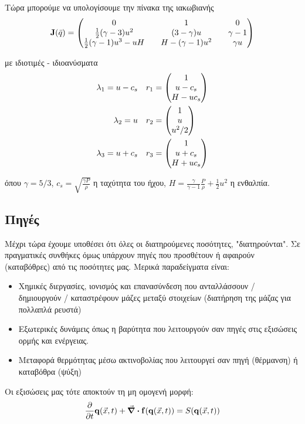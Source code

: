 Τώρα μπορούμε να υπολογίσουμε την πίνακα της ιακωβιανής
\begin{equation}
 \mathbf{J}(\bar{q}) = \mqty(0 && 1 && 0\\
	  \frac{1}{2}(\gamma-3)u^2 && (3-\gamma) u && \gamma-1 \\
	  \frac{1}{2}(\gamma-1)u^3-uH && H-(\gamma-1) u^2 && \gamma u)
\end{equation} 

με ιδιοτιμές - ιδιοανύσματα
\begin{align}
\lambda _1 = u-c_s && &r_1 =\mqty(1\\ u-c_s \\ H-uc_s) \\
\lambda _2 = u && &r_2 =\mqty(1\\ u \\ u^2/2) \\
\lambda _3 = u+c_s && &r_3 =\mqty(1\\ u+c_s \\ H+uc_s) \\
\end{align}

όπου $\gamma=5/3$, $c_s=\sqrt{\frac{\gamma P}{\rho}}$ η ταχύτητα του ήχου, $H=\frac{\gamma}{\gamma-1}\frac{P}{\rho}+\frac{1}{2}u^2$ η ενθαλπία.

\subsection{Πηγές}
Μέχρι τώρα έχουμε υποθέσει ότι όλες οι διατηρούμενες ποσότητες, "διατηρούνται". Σε πραγματικές συνθήκες όμως υπάρχουν πηγές που προσθέτουν ή αφαιρούν (καταβόθρες) από τις ποσότητες μας. Μερικά παραδείγματα είναι:
\begin{itemize}
	\item Χημικές διεργασίες, ιονισμός και επανασύνδεση που ανταλλάσσουν / δημιουργούν / καταστρέφουν μάζες μεταξύ στοιχείων (διατήρηση της μάζας για πολλαπλά ρευστά)
	\item Εξωτερικές δυνάμεις όπως η βαρύτητα που λειτουργούν σαν πηγές στις εξισώσεις ορμής και ενέργειας.
	\item Μεταφορά θερμότητας μέσω ακτινοβολίας που λειτουργεί σαν πηγή (θέρμανση) ή καταβόθρα (ψύξη)
\end{itemize}
Οι εξισώσεις μας τότε αποκτούν τη μη ομογενή μορφή:
\begin{equation}
\pdv{t} \mathbf{q}(\vec{x},t) + \div\mathbf{f}(\mathbf{q}(\vec{x},t)) = S(\mathbf{q}(\vec{x},t))
\end{equation}

